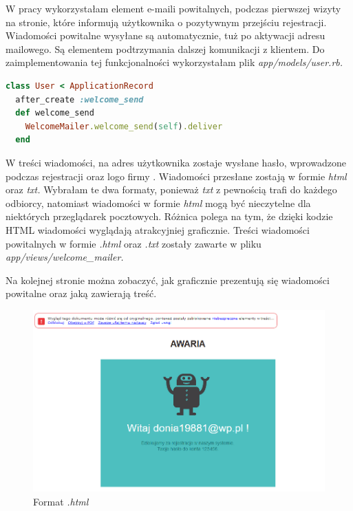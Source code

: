 \documentclass[openright]{xmgr}
\begin{document}
	W pracy wykorzystałam element e-maili powitalnych, podczas pierwszej wizyty na stronie, które informują użytkownika o pozytywnym przejściu rejestracji. Wiadomości powitalne wysyłane są automatycznie, tuż po aktywacji adresu mailowego. Są elementem podtrzymania dalszej komunikacji z klientem. Do zaimplementowania tej funkcjonalności wykorzystałam plik \textit{app/models/user.rb.} 
	
	\begin{lstlisting}[language=Ruby,lineskip={-1pt},caption=Kod odpowiedzialny za wysyłanie e-mail powitalnych]
class User < ApplicationRecord
  after_create :welcome_send
  def welcome_send
	WelcomeMailer.welcome_send(self).deliver
  end
	\end{lstlisting}
	
	W treści wiadomości, na adres użytkownika zostaje wysłane hasło, wprowadzone podczas rejestracji oraz logo firmy \cite{api}. Wiadomości przesłane zostają w formie \textit{html} oraz \textit{txt.} Wybrałam te dwa formaty, ponieważ \textit{txt} z pewnością trafi do każdego odbiorcy, natomiast wiadomości w formie \textit{html} mogą być nieczytelne dla niektórych przeglądarek pocztowych. Różnica polega na tym, że dzięki kodzie HTML wiadomości wyglądają atrakcyjniej graficznie.
	Treści wiadomości powitalnych w formie \textit{.html} oraz \textit{.txt} zostały zawarte w pliku \textit{app/views/welcome\_mailer.}
	
	Na kolejnej stronie można zobaczyć, jak graficznie prezentują się wiadomości powitalne oraz jaką zawierają treść. 
	\newpage
	\begin{figure}[!tbh]
		\centering
		\includegraphics[width=\linewidth]{image/emailhtml}
		\caption{Format \textit{.html}}
	\end{figure}
\end{document}
